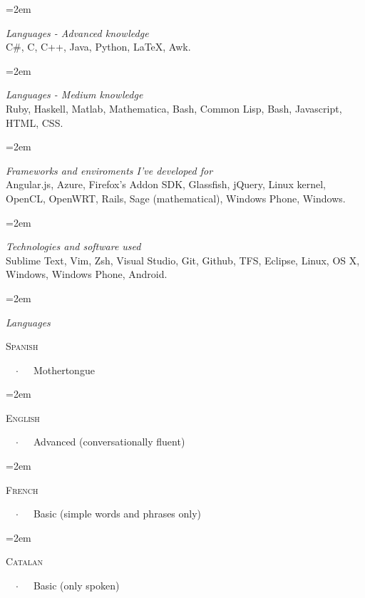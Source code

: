 \documentclass{scrartcl}
\newcommand{\Description}[1]{\hangindent=2em\hangafter=0\noindent\raggedright\footnotesize{#1}\par\normalsize\vspace{1em}} %
\newcommand{\header}[1]{{\small \textit{#1} \\ \vspace{0.2em}}}
\begin{document}
\begin{cv}{}
\vspace{1em} %


\vspace{1em}

\Description{\header{Languages - Advanced knowledge} C\#, C, C++, Java, Python, \LaTeX, Awk.}

\Description{\header{Languages - Medium knowledge} Ruby, Haskell, Matlab, Mathematica, Bash, Common Lisp, Bash, Javascript, HTML, CSS.}

\Description{\header{Frameworks and enviroments I've developed for}
Angular.js,
Azure,
Firefox's Addon SDK,
Glassfish,
jQuery,
Linux kernel,
OpenCL,
OpenWRT,
Rails,
Sage (mathematical),
Windows Phone,
Windows. }

\Description{\header{Technologies and software used} Sublime Text, Vim, Zsh, Visual Studio, Git, Github, TFS, Eclipse, Linux, OS X, Windows, Windows Phone, Android.}


\vspace{1em} %

\vspace{1em}

\newlength{\langbox} %
\settowidth{\langbox}{English} %

\Description{\header{Languages} \parbox{\langbox}{\textsc{Spanish}}\ \ $\cdotp$\ \ \ Mothertongue}

\vspace{-0.5em} %

\Description{\parbox{\langbox}{\textsc{English}}\ \ $\cdotp$\ \ \ Advanced (conversationally fluent)}

\vspace{-0.5em} %

\Description{\parbox{\langbox}{\textsc{French}}\ \ $\cdotp$\ \ \ Basic (simple words and phrases only)}
\vspace{-0.5em} %

\Description{\parbox{\langbox}{\textsc{Catalan}}\ \ $\cdotp$\ \ \ Basic (only spoken)}

\vspace{1em} %


\end{cv}
\end{document}
